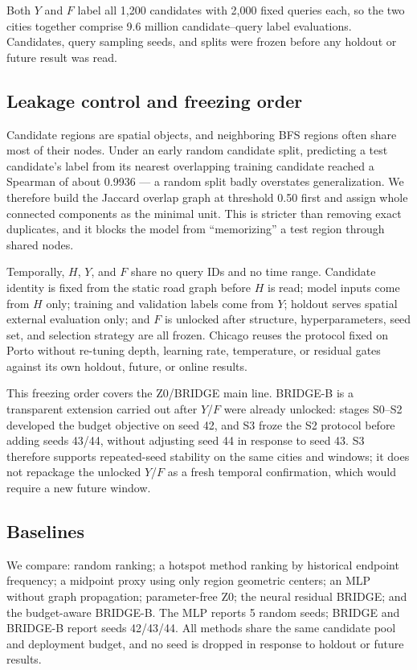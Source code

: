 \documentclass[5p,twocolumn,authoryear]{elsarticle}
\newcommand{\zmethod}{Z0}
\newcommand{\gmethod}{BRIDGE}
\newcommand{\bmethod}{BRIDGE-B}
\begin{document}
Both $Y$ and $F$ label all 1{,}200 candidates with 2{,}000 fixed queries each, so the two
cities together comprise 9.6 million candidate--query label evaluations. Candidates, query
sampling seeds, and splits were frozen before any holdout or future result was read.

\subsection{Leakage control and freezing order}

Candidate regions are spatial objects, and neighboring BFS regions often share most of
their nodes. Under an early random candidate split, predicting a test candidate's label
from its nearest overlapping training candidate reached a Spearman of about 0.9936 --- a
random split badly overstates generalization. We therefore build the Jaccard overlap graph
at threshold 0.50 first and assign whole connected components as the minimal unit. This is
stricter than removing exact duplicates, and it blocks the model from ``memorizing'' a test
region through shared nodes.

Temporally, $H$, $Y$, and $F$ share no query IDs and no time range. Candidate identity is
fixed from the static road graph before $H$ is read; model inputs come from $H$ only;
training and validation labels come from $Y$; holdout serves spatial external evaluation
only; and $F$ is unlocked after structure, hyperparameters, seed set, and selection strategy
are all frozen. Chicago reuses the protocol fixed on Porto without re-tuning depth,
learning rate, temperature, or residual gates against its own holdout, future, or online
results.

This freezing order covers the \zmethod/\gmethod{} main line. \bmethod{} is a transparent
extension carried out after $Y$/$F$ were already unlocked: stages S0--S2 developed the
budget objective on seed 42, and S3 froze the S2 protocol before adding seeds 43/44,
without adjusting seed 44 in response to seed 43. S3 therefore supports repeated-seed
stability on the same cities and windows; it does not repackage the unlocked $Y$/$F$ as a
fresh temporal confirmation, which would require a new future window.

\subsection{Baselines}

We compare: random ranking; a hotspot method ranking by historical endpoint frequency; a
midpoint proxy using only region geometric centers; an MLP without graph propagation;
parameter-free \zmethod; the neural residual \gmethod; and the budget-aware \bmethod. The
MLP reports 5 random seeds; \gmethod{} and \bmethod{} report seeds 42/43/44. All methods
share the same candidate pool and deployment budget, and no seed is dropped in response to
holdout or future results.
\end{document}
